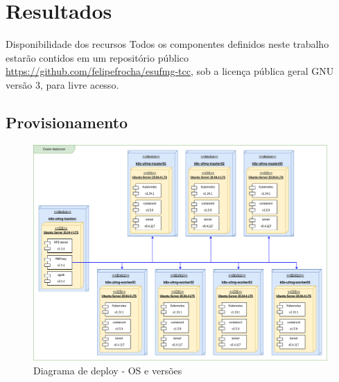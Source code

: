 \documentclass[10pt,brazil]{beamer}
\theoremstyle{definition}
\begin{document}


\section{Resultados}

\begin{frame}{Disponibilidade dos recursos}
  Todos os componentes definidos neste trabalho estarão contidos em um repositório público \href{https://github.com/felipefrocha/esufmg-tcc}{https://github.com/felipefrocha/esufmg-tcc}, sob a licença pública geral GNU versão 3, para livre acesso.
\end{frame}

\subsection{Provisionamento}

\begin{frame}
  \hspace*{-15mm}
  \begin{figure}
      \centering
      \includegraphics[width=.9\textwidth]{TCC - Kubenertes-Cluster Deplyment.drawio.png}
      \caption{Diagrama de deploy - OS e versões}
      \label{fig:k8s-arch-deploy}
  \end{figure}
  \end{frame}
\end{document}
